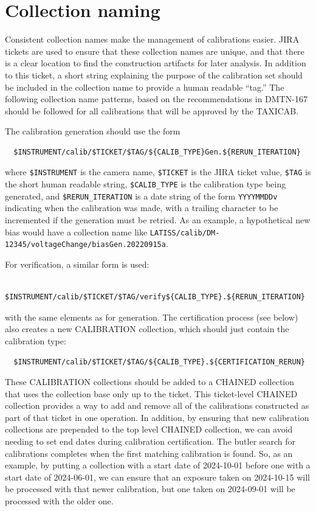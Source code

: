 \documentclass[DM,authoryear,toc]{lsstdoc}
\begin{document}
\section{Collection naming}

Consistent collection names make the management of calibrations easier.
JIRA tickets are used to ensure that these collection names are unique, and that there is a clear location to find the construction artifacts for later analysis.
In addition to this ticket, a short string explaining the purpose of the calibration set should be included in the collection name to provide a human readable ``tag.''
The following collection name patterns, based on the recommendations in DMTN-167 should be followed for all calibrations that will be approved by the TAXICAB.

The calibration generation should use the form
\begin{verbatim}
  $INSTRUMENT/calib/$TICKET/$TAG/${CALIB_TYPE}Gen.${RERUN_ITERATION}
\end{verbatim}
where \verb|$INSTRUMENT| is the camera name, \verb|$TICKET| is the JIRA ticket value, \verb|$TAG| is the short human readable string, \verb|$CALIB_TYPE| is the calibration type being generated, and \verb|$RERUN_ITERATION| is a date string of the form \verb|YYYYMMDDv| indicating when the calibration was made, with a trailing character to be incremented if the generation must be retried.
As an example, a hypothetical new bias would have a collection name like \verb|LATISS/calib/DM-12345/voltageChange/biasGen.20220915a|.

For verification, a similar form is used:
\begin{verbatim}
  $INSTRUMENT/calib/$TICKET/$TAG/verify${CALIB_TYPE}.${RERUN_ITERATION}
\end{verbatim}
with the same elements as for generation.
The certification process (see below) also creates a new CALIBRATION collection, which should just contain the calibration type:
\begin{verbatim}
  $INSTRUMENT/calib/$TICKET/$TAG/${CALIB_TYPE}.${CERTIFICATION_RERUN}
\end{verbatim}
These CALIBRATION collections should be added to a CHAINED collection that uses the collection base only up to the ticket.
This ticket-level CHAINED collection provides a way to add and remove all of the calibrations constructed as part of that ticket in one operation.
In addition, by ensuring that new calibration collections are prepended to the top level CHAINED collection, we can avoid needing to set end dates during calibration certification.
The butler search for calibrations completes when the first matching calibration is found.
So, as an example, by putting a collection with a start date of 2024-10-01 before one with a start date of 2024-06-01, we can ensure that an exposure taken on 2024-10-15 will be processed with that newer calibration, but one taken on 2024-09-01 will be processed with the older one.
\end{document}
